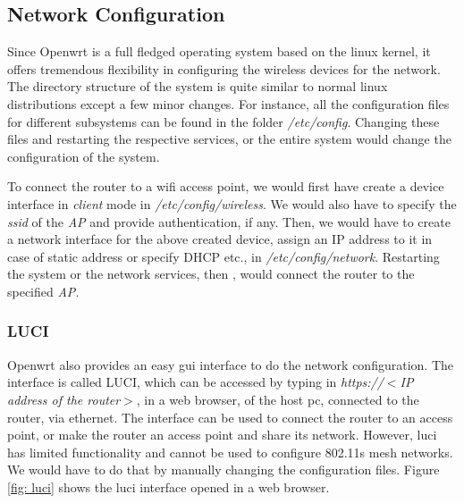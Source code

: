 \subsection{Network Configuration}
Since Openwrt is a full fledged operating system based on the linux kernel, it offers tremendous flexibility in configuring the wireless devices for the network. The directory structure of the system is quite similar to normal linux distributions except a few minor changes. For instance, all the configuration files for different subsystems can be found in the folder \textit{/etc/config}. Changing these files and restarting the respective services, or the entire system would change the configuration of the system.

To connect the router to a wifi access point, we would first have create a device interface in \textit{client} mode in \textit{/etc/config/wireless}. We would also have to specify the \textit{ssid} of the \textit{AP} and provide authentication, if any. Then, we would have to create a network interface for the above created device, assign an IP address to it in case of static address or specify DHCP etc., in \textit{/etc/config/network}. Restarting the system or the network services, then , would connect the router to the specified \textit{AP}.

\subsubsection{LUCI}
Openwrt also provides an easy gui interface to do the network configuration. The interface is called LUCI, which can be accessed by typing in \textit{https://$<$IP address of the router$>$}, in a web browser, of the host pc, connected to the router, via ethernet. The interface can be used to connect the router to an access point, or make the router an access point and share its network. However, luci has limited functionality and cannot be used to configure 802.11s mesh networks. We would have to do that by manually changing the configuration files. Figure \ref{fig: luci} shows the luci interface opened in a web browser.

